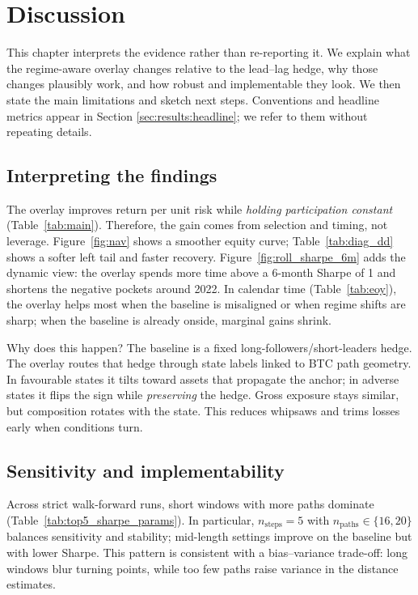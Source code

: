 \chapter{Discussion}\label{Chapter:Discussion}

This chapter interprets the evidence rather than re-reporting it. We explain what the regime-aware overlay changes relative to the lead--lag hedge, why those changes plausibly work, and how robust and implementable they look. We then state the main limitations and sketch next steps. Conventions and headline metrics appear in Section \ref{sec:results:headline}; we refer to them without repeating details.

\section{Interpreting the findings}\label{sec:disc:interpret}

The overlay improves return per unit risk while \emph{holding participation constant} (Table~\ref{tab:main}). Therefore, the gain comes from selection and timing, not leverage. Figure~\ref{fig:nav} shows a smoother equity curve; Table~\ref{tab:diag_dd} shows a softer left tail and faster recovery. Figure~\ref{fig:roll_sharpe_6m} adds the dynamic view: the overlay spends more time above a 6-month Sharpe of 1 and shortens the negative pockets around 2022. In calendar time (Table~\ref{tab:eoy}), the overlay helps most when the baseline is misaligned or when regime shifts are sharp; when the baseline is already onside, marginal gains shrink.

Why does this happen? The baseline is a fixed long-followers/short-leaders hedge. The overlay routes that hedge through state labels linked to BTC path geometry. In favourable states it tilts toward assets that propagate the anchor; in adverse states it flips the sign while \emph{preserving} the hedge. Gross exposure stays similar, but composition rotates with the state. This reduces whipsaws and trims losses early when conditions turn.

\section{Sensitivity and implementability}\label{sec:disc:robust}

Across strict walk-forward runs, short windows with more paths dominate (Table~\ref{tab:top5_sharpe_params}). In particular, \(n_{\text{steps}}{=}5\) with \(n_{\text{paths}}\in\{16,20\}\) balances sensitivity and stability; mid-length settings improve on the baseline but with lower Sharpe. This pattern is consistent with a bias–variance trade-off: long windows blur turning points, while too few paths raise variance in the distance estimates.

